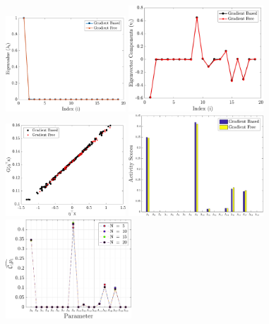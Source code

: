 \documentclass[11pt]{article}
\begin{document}
\begin{figure}[htbp]
 \begin{center}
  \includegraphics[width=0.40\textwidth]{./Figures/comp_eig}
\hspace{1mm}
  \includegraphics[width=0.45\textwidth]{./Figures/comp_eigv}
  \\ \vspace{5mm}
  \includegraphics[width=0.40\textwidth]{./Figures/comp_ssp}
\hspace{1mm}
  \includegraphics[width=0.45\textwidth]{./Figures/comp_as}
  \\ \vspace{5mm}
  \includegraphics[width=0.42\textwidth]{./Figures/ub_conv_kinetics_rich}
\end{center}
\end{figure}
\end{document}
